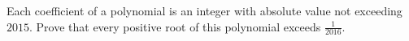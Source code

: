 Each coefficient of a polynomial is an integer with absolute value not exceeding $2015$. Prove that every positive root of this polynomial exceeds $\frac{1}{2016}$.